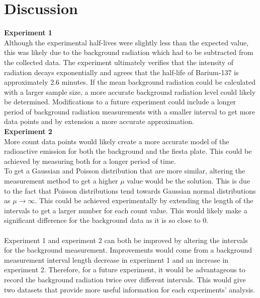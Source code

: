 \documentclass[
	letterpaper, %
	10pt, %
]{CSUniSchoolLabReport}
\begin{document}
\section{Discussion}
\vspace{20pt}
{\Large\textbf{Experiment 1}}\\

Although the experimental half-lives were slightly less than the expected value, this was likely due to the
background radiation which had to be subtracted from the collected data. The experiment ultimately
verifies that the intensity of radiation decays exponentially and agrees that the half-life of Barium-137 is
approximately 2.6 minutes. If the mean background radiation could be calculated with a larger sample size, a more
accurate background radiation level could likely be determined. Modifications to a future experiment could
include a longer period of background radiation measurements with a smaller interval to get more data points
and by extension a more accurate approximation.\\

{\Large\textbf{Experiment 2}}\\

More count data points would likely create a more accurate model of the radioactive emission for both
the background and the fiesta plate. This could be achieved by measuring both for a longer period of time.\\

To get a Gaussian and Poisson distribution that are more similar, altering the measurement method to get
a higher $\mu$ value would be the solution. This is due to the fact that Poisson distributions tend towards Gaussian
normal distributions as $\mu\rightarrow \infty$. This could be achieved experimentally by extending the length of the
intervals to get a larger number for each count value. This would likely make a significant difference for the
background data as it is so close to $0$.\\\\

Experiment 1 and experiment 2 can both be improved by altering the intervals for the background measurement. Improvements would come from a background measurement interval length decrease in experiment 1 and an increase in experiment 2. Therefore, for a future experiment, it would be advantageous to record the background radiation twice over different intervals. This would give two datasets that provide more useful information for each experiments' analysis.
\vspace{20pt}
\end{document}
